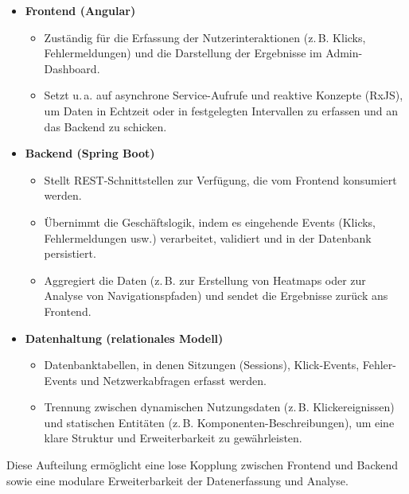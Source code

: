 \documentclass[12pt,oneside]{article}
\begin{document}
\begin{itemize}
    \item \textbf{Frontend (Angular)}
    \begin{itemize}
        \item Zuständig für die Erfassung der Nutzerinteraktionen (z.\,B. Klicks, Fehlermeldungen) und die Darstellung der Ergebnisse im Admin-Dashboard.
        \item Setzt u.\,a. auf asynchrone Service-Aufrufe und reaktive Konzepte (RxJS), um Daten in Echtzeit oder in festgelegten Intervallen zu erfassen und an das Backend zu schicken.
    \end{itemize}
    \item \textbf{Backend (Spring Boot)}
    \begin{itemize}
        \item Stellt REST-Schnittstellen zur Verfügung, die vom Frontend konsumiert werden.
        \item Übernimmt die Geschäftslogik, indem es eingehende Events (Klicks, Fehlermeldungen usw.) verarbeitet, validiert und in der Datenbank persistiert.
        \item Aggregiert die Daten (z.\,B. zur Erstellung von Heatmaps oder zur Analyse von Navigationspfaden) und sendet die Ergebnisse zurück ans Frontend.
    \end{itemize}
    \item \textbf{Datenhaltung (relationales Modell)}
    \begin{itemize}
        \item Datenbanktabellen, in denen Sitzungen (Sessions), Klick-Events, Fehler-Events und Netzwerkabfragen erfasst werden.
        \item Trennung zwischen dynamischen Nutzungsdaten (z.\,B. Klickereignissen) und statischen Entitäten (z.\,B. Komponenten-Beschreibungen), um eine klare Struktur und Erweiterbarkeit zu gewährleisten.
    \end{itemize}
\end{itemize}

Diese Aufteilung ermöglicht eine lose Kopplung zwischen Frontend und Backend sowie eine modulare Erweiterbarkeit der Datenerfassung und Analyse.


  
\end{document}
